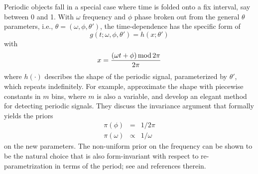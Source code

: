 Periodic objects fall in a special case where time is folded onto a fix interval, say between 0 and 1. With $\omega$ frequency and $\phi$ phase broken out from the general $\theta$ parameters, i.e., \mbox{$\theta\!=\!(\omega,\phi,\theta')$}, the time-dependence has the specific form of
%
\begin{equation}
g(t;\omega,\phi,\theta') = h(x;\theta')
\end{equation}
with
\begin{equation}
x = \frac{ (\omega{}t+\phi)\,{\rm{}mod}\,{2\pi} }{2\pi}
\end{equation}
%
where $h(\cdot)$ describes the shape of the periodic signal, parameterized by $\theta'$, which repeats indefinitely.
%
For example, \citet{gregory} approximate the shape with piecewise constants in $m$ bins, where $m$ is also a variable, and develop an elegant method for detecting periodic signals.
%
They discuss the invariance argument that formally yields the priors
\begin{eqnarray}
\pi(\phi) & = & 1 \big/ 2\pi \\
\pi(\omega)& \propto & 1 \big/ \omega
\end{eqnarray}
on the new parameters.
%
The non-uniform prior on the frequency can be shown to be the natural choice that is also form-invariant with respect to re-parametrization in terms of the period; see \citet{gregory} and references therein.


